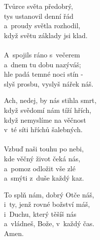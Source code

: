 \begin{translatioMulticol}{3}
Tvůrce světa předobrý,\\
tys ustanovil denní řád\\
a~proudy světla rozhodil,\\
když světu základy jsi klad.\\
\\
A~spojils ráno s~večerem\\
a~dnem tu dobu nazýváš;\\
hle padá temné noci stín -\\
slyš prosbu, vyslyš nářek náš.\columnbreak

Ach, nedej, by nás stihla smrt,\\
když svědomí nám tíží hřích,\\
když nemyslíme na věčnost\\
v~té síti hříchů šalebných.\\
\\
Vzbuď naši touhu po nebi,\\
kde věčný život čeká nás,\\
a~pomoz odložit vše zlé\\
a~smýti z~duše každý kaz.\columnbreak

To splň nám, dobrý Otče náš,\\
i~ty, jenž rovné božství máš,\\
i~Duchu, který těšíš nás\\
a~vládneš, Bože, v~každý čas.\\
Amen. 
\end{translatioMulticol}
